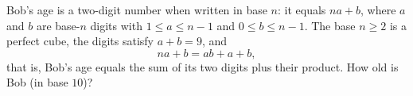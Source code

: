 Bob's age is a two-digit number when written in base $n$: it equals $na+b$, where $a$ and $b$ are base-$n$ digits with $1\le a\le n-1$ and $0\le b\le n-1$. The base $n\ge2$ is a perfect cube, the digits satisfy $a+b=9$, and
\[na+b=ab+a+b,\]
that is, Bob's age equals the sum of its two digits plus their product. How old is Bob (in base $10$)?
